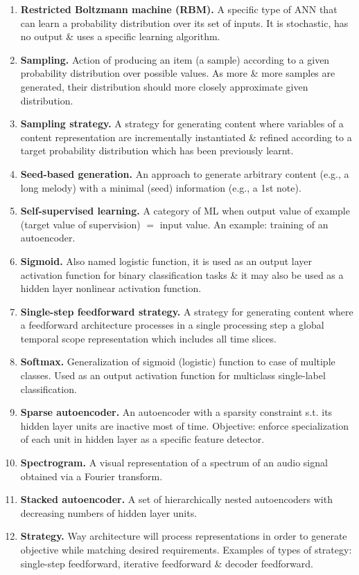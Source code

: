 \documentclass{article}
\begin{document}
\begin{itemize}
\begin{enumerate}
		\item {\bf Restricted Boltzmann machine (RBM).} A specific type of ANN that can learn a probability distribution over its set of inputs. It is stochastic, has no output \& uses a specific learning algorithm.
		\item {\bf Sampling.} Action of producing an item (a sample) according to a given probability distribution over possible values. As more \& more samples are generated, their distribution should more closely approximate given distribution.
		\item {\bf Sampling strategy.} A strategy for generating content where variables of a content representation are incrementally instantiated \& refined according to a target probability distribution which has been previously learnt.
		\item {\bf Seed-based generation.} An approach to generate arbitrary content (e.g., a  long melody) with a minimal (seed) information (e.g., a 1st note).
		\item {\bf Self-supervised learning.} A category of ML when output value of example (target value of supervision) $=$ input value. An example: training of an autoencoder.
		\item {\bf Sigmoid.} Also named logistic function, it is used as an output layer activation function for binary classification tasks \& it may also be used as a hidden layer nonlinear activation function.
		\item {\bf Single-step feedforward strategy.} A strategy for generating content where a feedforward architecture processes in a single processing step a global temporal scope representation which includes all time slices.
		\item {\bf Softmax.} Generalization of sigmoid (logistic) function to case of multiple classes. Used as an output activation function for multiclass single-label classification.
		\item {\bf Sparse autoencoder.} An autoencoder with a sparsity constraint s.t. its hidden layer units are inactive most of time. Objective: enforce specialization of each unit in hidden layer as a specific feature detector.
		\item {\bf Spectrogram.} A visual representation of a spectrum of an audio signal obtained via a Fourier transform.
		\item {\bf Stacked autoencoder.} A set of hierarchically nested autoencoders with decreasing numbers of hidden layer units.
		\item {\bf Strategy.} Way architecture will process representations in order to generate objective while matching desired requirements. Examples of types of strategy: single-step feedforward, iterative feedforward \& decoder feedforward.

\end{enumerate}
\end{itemize}
\end{document}
